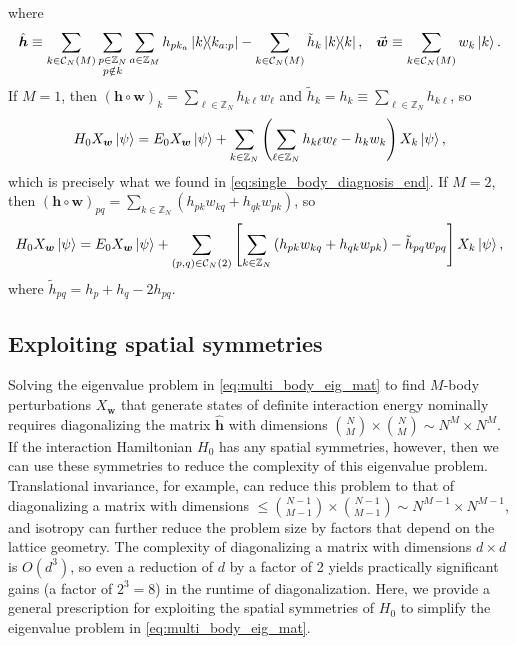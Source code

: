 \documentclass[nofootinbib,notitlepage,11pt]{revtex4-2}
\newcommand{\p}[1]{\left(#1\right)} %
\renewcommand{\sp}[1]{\left[#1\right]} %
\newcommand{\m}{\bm} %
\renewcommand{\v}{\vec} %
\newcommand{\1}{\mathds{1}}
\newcommand{\C}{\mathcal{C}}
\newcommand{\ZZ}{\mathbb{Z}}
\begin{document}
where
\begin{align}
  \hat{\m h} \equiv \sum_{k\in\C_N\p{M}}
  \sum_{\substack{p\in\ZZ_N\\p\notin k}}
  \sum_{a\in\ZZ_M} h_{pk_a} \op{k}{k_{a:p}}
  - \sum_{k\in\C_N\p{M}} \tilde h_k \op{k},
  &&
  \v{\m w} \equiv \sum_{k\in\C_N\p{M}} w_k \ket{k}.
\end{align}
If $M=1$, then
$\p{\m h\circ\m w}_k=\sum_{\ell\in\ZZ_N} h_{k\ell} w_\ell$ and
$\tilde h_k = h_k \equiv \sum_{\ell\in\ZZ_N} h_{k\ell}$, so
\begin{align}
  H_0 X_{\m w} \ket\psi
  = E_0 X_{\m w} \ket\psi + \sum_{k\in\ZZ_N}
  \p{\sum_{\ell\in\ZZ_N} h_{k\ell} w_\ell - h_k w_k} X_k \ket\psi,
\end{align}
which is precisely what we found in
\eqref{eq:single_body_diagnosis_end}.  If $M=2$, then
$\p{\m h\circ\m w}_{pq} = \sum_{k\in\ZZ_N}
\p{h_{pk}w_{kq}+h_{qk}w_{pk}}$, so
\begin{align}
  H_0 X_{\m w} \ket\psi
  = E_0 X_{\m w} \ket\psi + \sum_{\p{p,q}\in\C_N\p{2}}
  \sp{\sum_{k\in\ZZ_N}\p{h_{pk} w_{kq} + h_{qk} w_{pk}}
    - \tilde h_{pq} w_{pq}}
  X_k \ket\psi,
\end{align}
where $\tilde h_{pq}=h_p+h_q-2h_{pq}$.

\subsection{Exploiting spatial symmetries}
\label{sec:symmetries}

Solving the eigenvalue problem in \eqref{eq:multi_body_eig_mat} to
find $M$-body perturbations $X_{\m w}$ that generate states of
definite interaction energy nominally requires diagonalizing the
matrix $\hat{\m h}$ with dimensions
${N\choose M}\times{N\choose M}\sim N^M\times N^M$.  If the
interaction Hamiltonian $H_0$ has any spatial symmetries, however,
then we can use these symmetries to reduce the complexity of this
eigenvalue problem.  Translational invariance, for example, can reduce
this problem to that of diagonalizing a matrix with dimensions
$\le{N-1\choose M-1}\times{N-1\choose M-1}\sim N^{M-1}\times N^{M-1}$,
and isotropy can further reduce the problem size by factors that
depend on the lattice geometry.  The complexity of diagonalizing a
matrix with dimensions $d\times d$ is $O\p{d^3}$, so even a reduction
of $d$ by a factor of 2 yields practically significant gains (a factor
of $2^3=8$) in the runtime of diagonalization.  Here, we provide a
general prescription for exploiting the spatial symmetries of $H_0$ to
simplify the eigenvalue problem in \eqref{eq:multi_body_eig_mat}.
\end{document}
